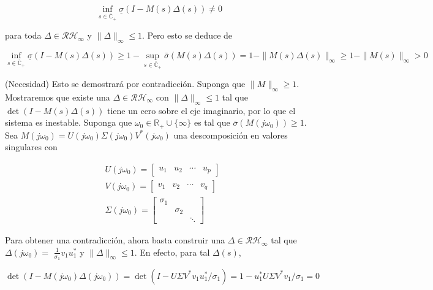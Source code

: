 $$
\inf _{s \in \overline{\mathbb{C}}_{+}} \underline{\sigma}(I-M(s) \Delta(s)) \neq 0
$$

para toda $\Delta \in \mathcal{R} \mathcal{H}_{\infty}$ y $\|\Delta\|_{\infty} \leq 1$. Pero esto se deduce de

$$
\inf _{s \in \overline{\mathbb{C}}_{+}} \underline{\sigma}(I-M(s) \Delta(s)) \geq 1-\sup _{s \in \overline{\mathbb{C}}_{+}} \bar{\sigma}(M(s) \Delta(s))=1-\|M(s) \Delta(s)\|_{\infty} \geq 1-\|M(s)\|_{\infty}>0
$$

(Necesidad) Esto se demostrará por contradicción. Suponga que $\|M\|_{\infty} \geq 1$. Mostraremos que existe una $\Delta \in \mathcal{R} \mathcal{H}_{\infty}$ con $\|\Delta\|_{\infty} \leq 1$ tal que $\operatorname{det}(I-M(s) \Delta(s))$ tiene un cero sobre el eje imaginario, por lo que el sistema es inestable. Suponga que $\omega_{0} \in \mathbb{R}_{+} \cup\{\infty\}$ es tal que $\bar{\sigma}\left(M\left(j \omega_{0}\right)\right) \geq 1$. Sea $M\left(j \omega_{0}\right)=U\left(j \omega_{0}\right) \Sigma\left(j \omega_{0}\right) V^{*}\left(j \omega_{0}\right)$ una descomposición en valores singulares con

$$
\begin{aligned}
& U\left(j \omega_{0}\right)=\left[\begin{array}{llll}
u_{1} & u_{2} & \cdots & u_{p}
\end{array}\right] \\
& V\left(j \omega_{0}\right)=\left[\begin{array}{llll}
v_{1} & v_{2} & \cdots & v_{q}
\end{array}\right] \\
& \Sigma\left(j \omega_{0}\right)=\left[\begin{array}{lll}
\sigma_{1} & & \\
& \sigma_{2} & \\
& & \ddots
\end{array}\right]
\end{aligned}
$$

Para obtener una contradicción, ahora basta construir una $\Delta \in \mathcal{R} \mathcal{H}_{\infty}$ tal que $\Delta\left(j \omega_{0}\right)=$ $\frac{1}{\sigma_{1}} v_{1} u_{1}^{*}$ y $\|\Delta\|_{\infty} \leq 1$. En efecto, para tal $\Delta(s)$,

$$
\operatorname{det}\left(I-M\left(j \omega_{0}\right) \Delta\left(j \omega_{0}\right)\right)=\operatorname{det}\left(I-U \Sigma V^{*} v_{1} u_{1}^{*} / \sigma_{1}\right)=1-u_{1}^{*} U \Sigma V^{*} v_{1} / \sigma_{1}=0
$$

